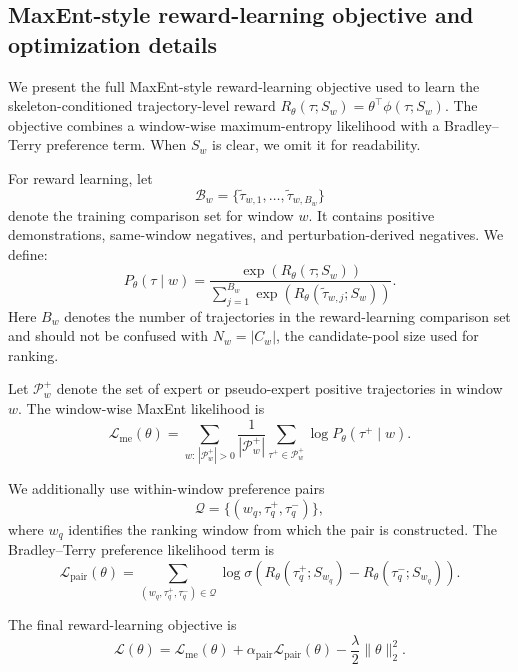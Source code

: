 \documentclass{article}
\begin{document}
\subsection{MaxEnt-style reward-learning objective and optimization details}
\label{sec:app_irl}

We present the full MaxEnt-style reward-learning objective used to learn the skeleton-conditioned trajectory-level reward
$R_\theta(\tau;S_w)=\theta^\top\phi(\tau;S_w)$.
The objective combines a window-wise maximum-entropy likelihood with a Bradley--Terry preference term.
When $S_w$ is clear, we omit it for readability.

For reward learning, let
\[
\mathcal{B}_w=\{\tilde{\tau}_{w,1},\ldots,\tilde{\tau}_{w,B_w}\}
\]
denote the training comparison set for window $w$.
It contains positive demonstrations, same-window negatives, and perturbation-derived negatives.
We define:
\begin{equation}
P_\theta(\tau \mid w)
=
\frac{\exp\left(R_\theta(\tau;S_w)\right)}
{\sum_{j=1}^{B_w}\exp\left(R_\theta(\tilde{\tau}_{w,j};S_w)\right)}.
\end{equation}
Here $B_w$ denotes the number of trajectories in the reward-learning comparison set and should not be confused with $N_w=|C_w|$, the candidate-pool size used for ranking.

Let $\mathcal{P}_w^+$ denote the set of expert or pseudo-expert positive trajectories in window $w$.
The window-wise MaxEnt likelihood is
\begin{equation}
\mathcal{L}_{\mathrm{me}}(\theta)
=
\sum_{w:\,|\mathcal{P}_w^+|>0}
\frac{1}{|\mathcal{P}_w^+|}
\sum_{\tau^+\in \mathcal{P}_w^+}
\log P_\theta(\tau^+\mid w).
\end{equation}

We additionally use within-window preference pairs
\[
\mathcal{Q}=\{(w_q,\tau_q^+,\tau_q^-)\},
\]
where $w_q$ identifies the ranking window from which the pair is constructed.
The Bradley--Terry preference likelihood term is
\begin{equation}
\mathcal{L}_{\mathrm{pair}}(\theta)
=
\sum_{(w_q,\tau_q^+,\tau_q^-)\in\mathcal{Q}}
\log \sigma\!\left(
R_\theta(\tau_q^+;S_{w_q})
-
R_\theta(\tau_q^-;S_{w_q})
\right).
\end{equation}

The final reward-learning objective is
\begin{equation}
\mathcal{L}(\theta)
=
\mathcal{L}_{\mathrm{me}}(\theta)
+
\alpha_{\mathrm{pair}}\mathcal{L}_{\mathrm{pair}}(\theta)
-
\frac{\lambda}{2}\|\theta\|_2^2.
\end{equation}
\end{document}
